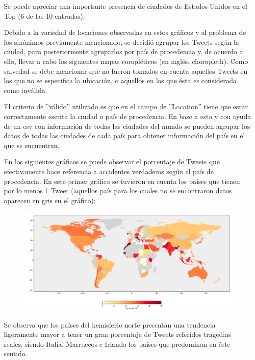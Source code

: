 \documentclass[titlepage,a4paper]{article}
\begin{document}
    Se puede apreciar una importante presencia de ciudades de Estados Unidos en el Top (6 de las 10 entradas). 
    
    Debido a la variedad de locaciones observadas en estos gráficos y al problema de los sinónimos previamente mencionado, se decidió agrupar los Tweets según la ciudad, para posteriormente agruparlos por país de procedencia y, de acuerdo a ello, llevar a cabo los siguientes mapas coropléticos (en inglés, choropleth). Como salvedad se debe mencionar que no fueron tomados en cuenta aquellos Tweets en los que no se especifica la ubicación, o aquellos en los que ésta es considerada como inválida.
    
    El criterio de ''válido'' utilizado es que en el campo de ''Location'' tiene que estar correctamente escrita la ciudad o país de procedencia. En base a esto y con ayuda de un csv con información de todas las ciudades del mundo se pueden agrupar los datos de todas las ciudades de cada país para obtener información del país en el que se encuentran.  
    
    En los siguientes gráficos se puede observar el porcentaje de Tweets que efectivamente hace referencia a accidentes verdaderos según el país de procedencia. En este primer gráfico se tuvieron en cuenta los países que tienen por lo menos 1 Tweet (aquellos país para los cuales no se encontraron datos aparecen en gris en el gráfico):
    
    \begin{figure}[H]
    \raggedleft
    \includegraphics[width=1.1\textwidth]{graficos/Analisis de Locacion/map1.png}
    \caption{}
    \end{figure}
    
    Se observa que los países del hemisferio norte presentan una tendencia ligeramente mayor a tener un gran porcentaje de Tweets referidos tragedias reales, siendo Italia, Marruecos e Irlanda los países que predominan en éste sentido.
\end{document}
